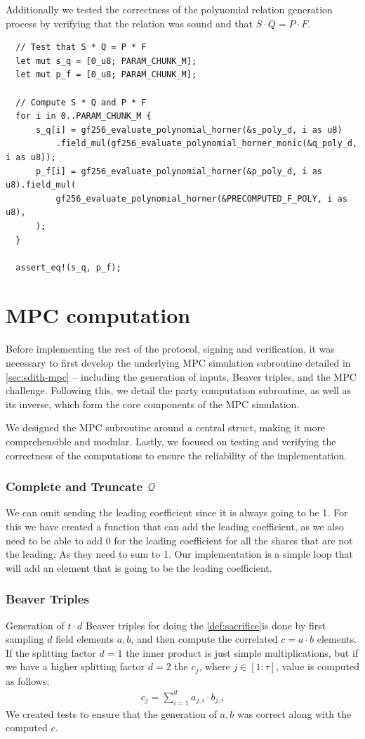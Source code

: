 \documentclass[11pt]{report}
\theoremstyle{definition}
\theoremstyle{plain}
\begin{document}
Additionally we tested the correctness of the polynomial relation generation process by verifying that the relation was sound and that $S \cdot Q = P \cdot F$.

\begin{verbatim}
  // Test that S * Q = P * F
  let mut s_q = [0_u8; PARAM_CHUNK_M];
  let mut p_f = [0_u8; PARAM_CHUNK_M];

  // Compute S * Q and P * F
  for i in 0..PARAM_CHUNK_M {
      s_q[i] = gf256_evaluate_polynomial_horner(&s_poly_d, i as u8)
          .field_mul(gf256_evaluate_polynomial_horner_monic(&q_poly_d, i as u8));
      p_f[i] = gf256_evaluate_polynomial_horner(&p_poly_d, i as u8).field_mul(
          gf256_evaluate_polynomial_horner(&PRECOMPUTED_F_POLY, i as u8),
      );
  }

  assert_eq!(s_q, p_f);
\end{verbatim}

\section{MPC computation}\label{sub:mpc_algo}
Before implementing the rest of the protocol, signing and verification, it was necessary to first develop the underlying MPC simulation subroutine detailed in \autoref{sec:sdith-mpc} -- including the generation of inputs, Beaver triples, and the MPC challenge. Following this, we detail the party computation subroutine, as well as its inverse, which form the core components of the MPC simulation.

We designed the MPC subroutine around a central  struct, making it more comprehensible and modular. Lastly, we focused on testing and verifying the correctness of the computations to ensure the reliability of the implementation.

\subsubsection{Complete and Truncate $\mathcal{Q}$}
We can omit sending the leading coefficient since it is always going to be 1. For this we have created a function that can add the leading coefficient, as we also need to be able to add 0 for the leading coefficient for all the shares that are not the leading. As they need to sum to 1. Our implementation is a simple loop that will add an element that is going to be the leading coefficient.

\subsubsection{Beaver Triples}
Generation of $t \cdot d$ Beaver triples for doing the \autoref{def:sacrifice}is done by first sampling $d$ field elements $a,b$, and then compute the correlated $c = a \cdot b$ elements. If the splitting factor $d=1$ the inner product is just simple multiplications, but if we have a higher splitting factor $d=2$ the $c_j$, where $j \in [1:\tau]$, value is computed as follows:
\begin{align}
  c_j = \sum_{i=1}^{d} a_{ j,i } \cdot b_{j,i}
\end{align}
We created tests to ensure that the generation of $a,b$ was correct along with the computed $c$.
\end{document}
